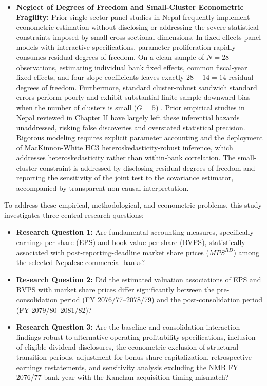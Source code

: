 \begin{itemize}
\item \textbf{Neglect of Degrees of Freedom and Small-Cluster Econometric Fragility:}
Prior single-sector panel studies in Nepal frequently implement econometric estimation without disclosing or addressing the severe statistical constraints imposed by small cross-sectional dimensions. In fixed-effects panel models with interactive specifications, parameter proliferation rapidly consumes residual degrees of freedom. On a clean sample of $N = 28$ observations, estimating individual bank fixed effects, common fiscal-year fixed effects, and four slope coefficients leaves exactly $28 - 14 = 14$ residual degrees of freedom. Furthermore, standard cluster-robust sandwich standard errors perform poorly and exhibit substantial finite-sample downward bias when the number of clusters is small ($G = 5$) \citep{cameron2008clusters}. Prior empirical studies in Nepal reviewed in Chapter II have largely left these inferential hazards unaddressed, risking false discoveries and overstated statistical precision. Rigorous modeling requires explicit parameter accounting and the deployment of MacKinnon-White HC3 heteroskedasticity-robust inference, which addresses heteroskedasticity rather than within-bank correlation. The small-cluster constraint is addressed by disclosing residual degrees of freedom and reporting the sensitivity of the joint test to the covariance estimator, accompanied by transparent non-causal interpretation.
\end{itemize}

To address these empirical, methodological, and econometric problems, this study investigates three central research questions:
\begin{itemize}
\item \textbf{Research Question 1:} Are fundamental accounting measures, specifically earnings per share (EPS) and book value per share (BVPS), statistically associated with post-reporting-deadline market share prices ($\mathit{MPS}^{RD}$) among the selected Nepalese commercial banks?
\item \textbf{Research Question 2:} Did the estimated valuation associations of EPS and BVPS with market share prices differ significantly between the pre-consolidation period (FY 2076/77--2078/79) and the post-consolidation period (FY 2079/80--2081/82)?
\item \textbf{Research Question 3:} Are the baseline and consolidation-interaction findings robust to alternative operating profitability specifications, inclusion of eligible dividend disclosures, the econometric exclusion of structural transition periods, adjustment for bonus share capitalization, retrospective earnings restatements, and sensitivity analysis excluding the NMB FY 2076/77 bank-year with the Kanchan acquisition timing mismatch?
\end{itemize}

